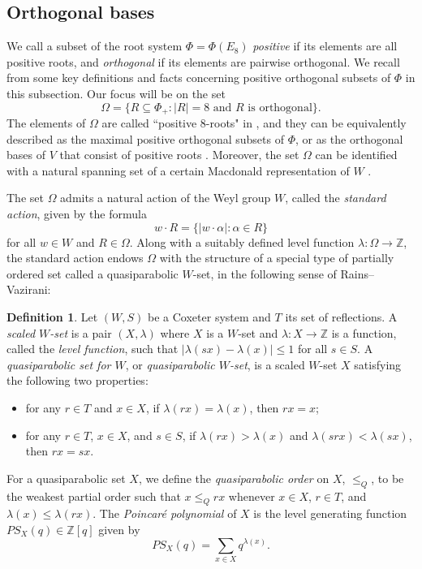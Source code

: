 \documentclass[11pt]{amsart}
\theoremstyle{plain}
\theoremstyle{definition}
\newtheorem{defn}[theorem]{Definition}
\theoremstyle{remark}
\numberwithin{equation}{section}
\newcommand{\al}{\alpha}
\newcommand{\Z}{{\mathbb Z}}
\newcommand{\ra}{\rightarrow}
\newcommand{\ob}{\Omega}
\newcommand{\se}{\subseteq}
\newcommand{\abs}[1]{\lvert #1 \rvert}
\begin{document}
\subsection{Orthogonal bases}
\label{sec:2025}

We call a subset of the root system $\Phi=\Phi(E_8)$ \emph{positive} if its
elements are all positive roots, and \emph{orthogonal} if its elements are
pairwise orthogonal. We recall from \cite{gx5,gx6} some key definitions and
facts concerning positive orthogonal subsets of $\Phi$ in this subsection. Our
focus will be on the set 
\[
  \ob=\{R\se \Phi_+: \abs{R}=8 \text{ and $R$ is orthogonal}\}.
\] 
The elements of $\ob$ are called ``positive $8$-roots" in \cite{gx5,gx6}, and
they can be equivalently described as the maximal positive orthogonal subsets of
$\Phi$, or as the orthogonal bases of $V$ that consist of positive roots
\cite[Remark 2.4 (ii)]{gx6}. Moreover, the set $\ob$ can be identified with a
natural spanning set of a certain Macdonald representation of $W$ \cite[Section
3]{gx5}. 

The set $\ob$ admits a natural action of the Weyl group $W$, called the
\emph{standard action}, given by the formula 
\[ 
  w\cdot R=\{\abs{w\cdot \al}:\al\in R\} 
\] 
for all $w\in W$ and $R\in \ob$. Along with a suitably defined level function
$\lambda:\ob\ra \Z$, the standard action endows $\ob$ with the structure of a
special type of partially ordered set called a quasiparabolic $W$-set, in the
following sense of Rains--Vazirani: 

\begin{defn}
\cite[Section 2, Section 5]{rains13}
\label{def:qpset}
Let $(W,S)$ be a Coxeter system and $T$ its set of reflections. A {\it scaled
$W$-set} is a pair $(X, \lambda)$ where $X$ is a $W$-set and $\lambda : X
\rightarrow \Z$ is a function, called the \emph{level function}, such that
$|\lambda(sx) - \lambda(x)| \leq 1$ for all $s \in S$. A {\it quasiparabolic
set for $W$}, or \emph{quasiparabolic $W$-set}, is a scaled $W$-set $X$
satisfying the following two properties:
\begin{itemize}[leftmargin=3.2em] 
  \item[(QP1)]{for any $r \in T$ and $x \in X$,
    if $\lambda(rx) = \lambda(x)$, then $rx = x$;} 
  \item[(QP2)]{for any $r \in
T$, $x \in X$, and $s \in S$, if $\lambda(rx) > \lambda(x)$ and $\lambda(srx) <
\lambda(sx)$, then $rx = sx$.} 
\end{itemize} 
For a quasiparabolic set $X$, we define the \emph{quasiparabolic order} on $X$,
$\le_Q$, to be the weakest partial order such that $x \leq_Q rx$ whenever $x \in
X$, $r \in T$, and $\lambda(x) \leq \lambda(rx)$. The \emph{Poincar\'e
polynomial} of $X$ is the level generating function $PS_X(q)\in \Z[q]$ given by
\[
  PS_X(q)=\sum_{x\in X}q^{\lambda(x)}.
\]
\end{defn}
\end{document}
